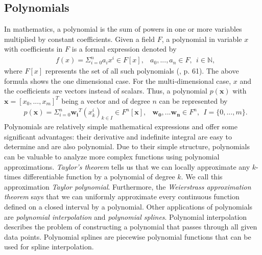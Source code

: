 \subsection{Polynomials}
In mathematics, a polynomial is the sum of powers in one or more variables multiplied by constant coefficients. Given a field $F$, a polynomial in variable $x$ with coefficients in $F$ is a formal expression denoted by
\begin{align*}
  &f(x) = \Sigma_{i=0}^{n} a_i x^i \in F[x], &a_0, ..., a_n \in F, \ \ i \in \mathbb{N},
\end{align*}
where $F[x]$ represents the set of all such polynomials (\cite{fischer2014}, p. 61). The above formula shows the one dimensional case. For the multi-dimensional case, $x$ and the coefficients are vectors instead of scalars. Thus, a polynomial $p(\mathbf{x})$ with $\mathbf{x} = [x_0, ..., x_m]^T$ being a vector and of degree $n$ can be represented by
\begin{align*}
  &p(\mathbf{x}) = \Sigma_{i=0}^{n} \mathbf{w_i}^T (x_k^i)_{k \in I} \in F^n[\mathbf{x}], &\mathbf{w_0}, ... \mathbf{w_n} \in F^n, \ \ I = \{0, ..., m\}.
\end{align*}
Polynomials are relatively simple mathematical expressions and offer some significant advantages: their derivative and indefinite integral are easy to determine and are also polynomial. Due to their simple structure, polynomials can be valuable to analyze more complex functions using polynomial approximations. \textit{Taylor's theorem} tells us that we can locally approximate any $k$-times differentiable function by a polynomial of degree $k$. We call this approximation \textit{Taylor polynomial}. Furthermore, the \textit{Weierstrass approximation theorem} says that we can uniformly approximate every continuous function defined on a closed interval by a polynomial. Other applications of polynomials are \textit{polynomial interpolation} and \textit{polynomial splines}. Polynomial interpolation describes the problem of constructing a polynomial that passes through all given data points. Polynomial splines are piecewise polynomial functions that can be used for spline interpolation.

